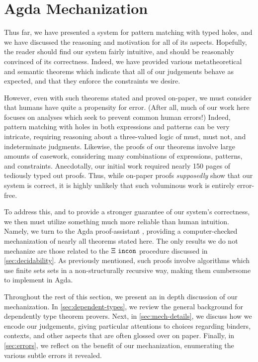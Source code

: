 \section{Agda Mechanization}\label{sec:mechanization}
Thus far, we have presented a system for pattern matching with typed holes, and we have discussed the reasoning and motivation for all of its aspects. Hopefully, the reader should find our system fairly intuitive, and should be reasonably convinced of its correctness. Indeed, we have provided various metatheoretical and semantic theorems which indicate that all of our judgements behave as expected, and that they enforce the constraints we desire.

However, even with such theorems stated and proved on-paper, we must consider that humans have quite a propensity for error. (After all, much of our work here focuses on analyses which seek to prevent common human errors!) Indeed, pattern matching with holes in both expressions and patterns can be very intricate, requiring reasoning about a three-valued logic of must, must not, and indeterminate judgments. Likewise, the proofs of our theorems involve large amounts of casework, considering many combinations of expressions, patterns, and constraints. Anecdotally, our initial work required nearly 150 pages of tediously typed out proofs. Thus, while on-paper proofs \emph{supposedly} show that our system is correct, it is highly unlikely that such voluminous work is entirely error-free.

To address this, and to provide a stronger guarantee of our system's correctness, we then must utilize something much more reliable than human intuition. Namely, we turn to the Agda proof-assistant \cite{norell:thesis}, providing a computer-checked mechanization of nearly all theorems stated here. The only results we do not mechanize are those related to the $\Xi ~\mathtt{incon}$ procedure discussed in \autoref{sec:decidability}. As previously mentioned, such proofs involve algorithms which use finite sets sets in a non-structurally recursive way, making them cumbersome to implement in Agda.

Throughout the rest of this section, we present an in depth discussion of our mechanization. In \autoref{sec:dependent-types}, we review the general background for dependently type theorem provers. Next, in \autoref{sec:mech-details}, we discuss how we encode our judgements, giving particular attentions to choices regarding binders, contexts, and other aspects that are often glossed over on paper. Finally, in \autoref{sec:errors}, we reflect on the benefit of our mechanization, enumerating the various subtle errors it revealed. 

